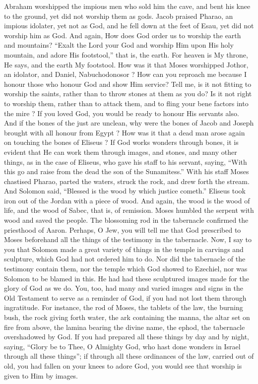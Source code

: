 \documentclass[10pt]{book}
\newcommand{\switchEnglish}{\selectlanguage{english} \switchcolumn}
\begin{document}
\begin{paracol}{2}
\switchEnglish

Abraham worshipped the impious men who 
sold him the cave, and bent his knee to the 
ground, yet did not worship them as gods. 
Jacob praised Pharao, an impious idolater, yet 
not as God, and he fell down at the feet of 
Esau, yet did not worship him as God. And 
again, How does God order us to worship 
the earth and mountains? ``Exalt the Lord 
your God and worship Him upon His holy 
mountain, and adore His footstool,'' that is, 
the earth. For heaven is My throne, He 
says, and the earth My footstool. How was 
it that Moses worshipped Jothor, an idolator, 
and Daniel, Nabuchodonosor ? How can you 
reproach me because I honour those who 
honour God and show Him service? Tell 
me, is it not fitting to worship the saints, 
rather than to throw stones at them as you 
do? Is it not right to worship them, rather 
than to attack them, and to fling your bene 
factors into the mire ? If you loved God, 
you would be ready to honour His servants 
also. And if the bones of the just are 
unclean, why were the bones of Jacob and 
Joseph brought with all honour from Egypt ? 
How was it that a dead man arose again on 
touching the bones of Eliseus ? If God works 
wonders through bones, it is evident that He 
can work them through images, and stones, 
and many other things, as in the case of 
Eliseus, who gave his staff to his servant, 
saying, ``With this go and raise from the dead 
the son of the Sunamitess.'' With his staff 
Moses chastised Pharao, parted the waters, 
struck the rock, and drew forth the stream. 
And Solomon said, ``Blessed is the wood by 
which justice cometh.'' Eliseus took iron out 
of the Jordan with a piece of wood. And 
again, the wood is the wood of life, and the 
wood of Sabec, that is, of remission. Moses 
humbled the serpent with wood and saved the 
people. The blossoming rod in the tabernacle 
confirmed the priesthood of Aaron. Perhaps, 
O Jew, you will tell me that God prescribed 
to Moses beforehand all the things of the 
testimony in the tabernacle. Now, I say to 
you that Solomon made a great variety of 
things in the temple in carvings and sculpture, 
which God had not ordered him to do. Nor 
did the tabernacle of the testimony contain 
them, nor the temple which God showed to 
Ezechiel, nor was Solomon to be blamed in 
this. He had had these sculptured images 
made for the glory of God as we do. You, 
too, had many and varied images and signs 
in the Old Testament to serve as a reminder 
of God, if you had not lost them through 
ingratitude. For instance, the rod of Moses, 
the tablets of the law, the burning bush, the 
rock giving forth water, the ark containing 
the manna, the altar set on fire from above,
the lamina bearing the divine 
name, the ephod, the tabernacle overshadowed 
by God. If you had prepared all these things 
by day and by night, saying, ``Glory be to 
Thee, O Almighty God, who hast done 
wonders in Israel through all these things''; 
if through all these ordinances of the law, 
carried out of old, you had fallen on your 
knees to adore God, you would see that 
worship is given to Him by images. 


\end{paracol}
\end{document}
